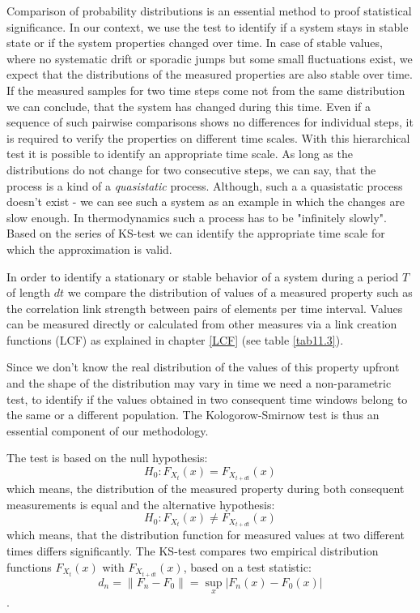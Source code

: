 \documentclass[a4paper,10pt]{scrbook}
\begin{document}

\cite{Young77}

Comparison of probability distributions is an essential method to proof statistical significance. In our context, we use the test to identify if a system stays in stable state or if the system properties changed over time. In case of stable values, where no systematic drift or sporadic jumps but some small fluctuations exist, we expect that the distributions of the measured properties are also stable over time. If the measured samples for two time steps come not from the same distribution we can conclude, that the system has changed during this time. Even if a sequence of such pairwise comparisons shows no differences for individual steps, it is required to verify the properties on different time scales. With this hierarchical test it is possible to identify an appropriate time scale. As long as the distributions do not change for two consecutive steps, we can say, that the process is a kind of a \textit{quasistatic} process. Although, such a a quasistatic process doesn't exist - we can see such a system as an example in which the changes are slow enough. In thermodynamics such a process has to be "infinitely slowly". Based on the series of KS-test we can identify the appropriate time scale for which the approximation is valid.

In order to identify a stationary or stable behavior of a system during a period $T$ of length $dt$ we compare the distribution of values of a measured property such as the correlation link strength between pairs of elements per time interval. Values can be measured directly or calculated from other measures via a link creation functions (LCF) as explained in chapter \ref{LCF} (see table \ref{tab11.3}). 

Since we don't know the real distribution of the values of this property upfront and the shape of the distribution may vary in time we need a non-parametric test, to identify if the values obtained in two consequent time windows belong to the same or a different population. The Kologorow-Smirnow test is thus an essential component of our methodology. 

The test is based on the null hypothesis:
\begin{equation}
H_0 \colon F_{X_{t}}(x) = F_{X_{t + dt}}(x)
\end{equation}
which means, the distribution of the measured property during both consequent measurements is equal and the alternative hypothesis:
\begin{equation}
H_0 \colon F_{X_{t}}(x) \neq F_{X_{t + dt}}(x)
\end{equation}
which means, that the distribution function for measured values at two different times differs significantly. The KS-test compares two empirical distribution functions $F_{X_{t}}(x)$ with $F_{X_{t + dt}}(x)$, based on a test statistic:
\begin{equation}
d_n=\| F_n-F_0 \| = \sup_x | F_n(x) - F_0(x) | 
\end{equation}.
\end{document}
